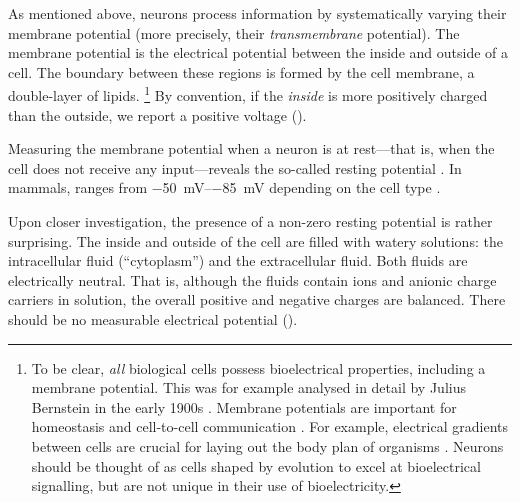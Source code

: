As mentioned above, neurons process information by systematically varying their membrane potential \vMem (more precisely, their \emph{transmembrane} potential).
The membrane potential is the electrical potential between the inside and outside of a cell.
The boundary between these regions is formed by the cell membrane, a double-layer of lipids.%
\footnote{To be clear, \emph{all} biological cells possess bioelectrical properties, including a membrane potential.
This was for example analysed in detail by Julius Bernstein in the early 1900s \citep{bernstein1912elektrobiologie}. Membrane potentials are important for homeostasis and cell-to-cell communication \citep{moorhouse2016membrane}.
For example, electrical gradients between cells are crucial for laying out the body plan of organisms \citep{levin2014molecular}.
Neurons should be thought of as cells shaped by evolution to excel at bioelectrical signalling, but are not unique in their use of bioelectricity.}
By convention, if the \emph{inside} is more positively charged than the outside, we report a positive voltage ().

Measuring the membrane potential when a neuron is at rest---that is, when the cell does not receive any input---reveals the so-called resting potential \vRest.
In mammals, \vRest ranges from \SIrange{-50}{-85}{\milli\volt} depending on the cell type \citep{moorhouse2016membrane}.

Upon closer investigation, the presence of a non-zero resting potential is rather surprising.
The inside and outside of the cell are filled with watery solutions: the intracellular fluid (\enquote{cytoplasm}) and the extracellular fluid.
Both fluids are electrically neutral.
That is, although the fluids contain ions and anionic charge carriers in solution, the overall positive and negative charges are balanced.
There should be no measurable electrical potential ().


